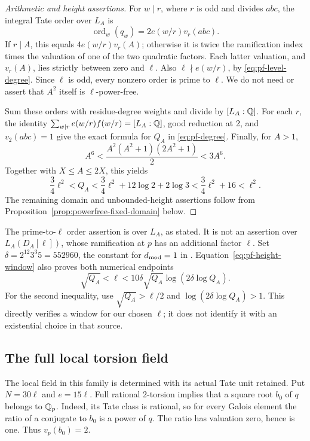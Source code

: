 \begin{proof}[Arithmetic and height assertions]
For \(w\mid r\), where \(r\) is odd and divides \(abc\), the integral
Tate order over \(L_A\) is
\[
 \operatorname{ord}_w(q_w)=2e(w/r)v_r(abc).
\]
If \(r\mid A\), this equals \(4e(w/r)v_r(A)\); otherwise it is twice
the ramification index times the valuation of one of the two quadratic
factors. Each latter valuation, and \(v_r(A)\), lies strictly between
zero and \(\ell\). Also \(\ell\nmid e(w/r)\), by
\eqref{eq:pf-level-degree}. Since \(\ell\) is odd, every nonzero order
is prime to \(\ell\). We do not need or assert that \(A^2\) itself is
\(\ell\)-power-free.

Sum these orders with residue-degree weights and divide by \([L_A:\mathbb Q]\).
For each \(r\), the identity \(\sum_{w\mid r}e(w/r)f(w/r)=[L_A:\mathbb Q]\),
good reduction at 2, and \(v_2(abc)=1\) give the exact formula for \(Q_A\)
in \eqref{eq:pf-degree}. Finally, for \(A>1\),
\[
 A^6<\frac{A^2(A^2+1)(2A^2+1)}2<3A^6.
\]
Together with \(X\le A\le2X\), this yields
\begin{equation}\label{eq:pf-height-window}
 \frac34\ell^2<Q_A
 <\frac34\ell^2+12\log2+2\log3
 <\frac34\ell^2+16<\ell^2.
\end{equation}
The remaining domain and unbounded-height assertions follow from
Proposition~\ref{prop:powerfree-fixed-domain} below.
\end{proof}

The prime-to-\(\ell\) order assertion is over \(L_A\), as stated. It is
not an assertion over \(L_A(D_A[\ell])\), whose ramification at \(p\)
has an additional factor \(\ell\).
Set \(\delta=2^{12}3^3 5=552960\), the constant for \(d_{\rm mod}=1\)
in \cite[Theorem~5.7.1]{JoshiIV}. Equation~\eqref{eq:pf-height-window}
also proves both numerical endpoints
\begin{equation}\label{eq:pf-joshi-window}
 \sqrt{Q_A}<\ell
 <10\delta\sqrt{Q_A}\log(2\delta\log Q_A).
\end{equation}
For the second inequality, use \(\sqrt{Q_A}>\ell/2\) and
\(\log(2\delta\log Q_A)>1\). This directly verifies a window for our
chosen \(\ell\); it does not identify it with an existential choice in
that source.

\subsection{The full local torsion field}

The local field in this family is determined with its actual Tate unit
retained. Put \(N=30\ell\) and \(e=15\ell\). Full rational 2-torsion
implies that a square root \(b_0\) of \(q\) belongs to \(\mathbb Q_p\).
Indeed, its Tate class is rational, so for every Galois element the ratio
of a conjugate to \(b_0\) is a power of \(q\). The ratio has valuation
zero, hence is one. Thus \(v_p(b_0)=2\).

